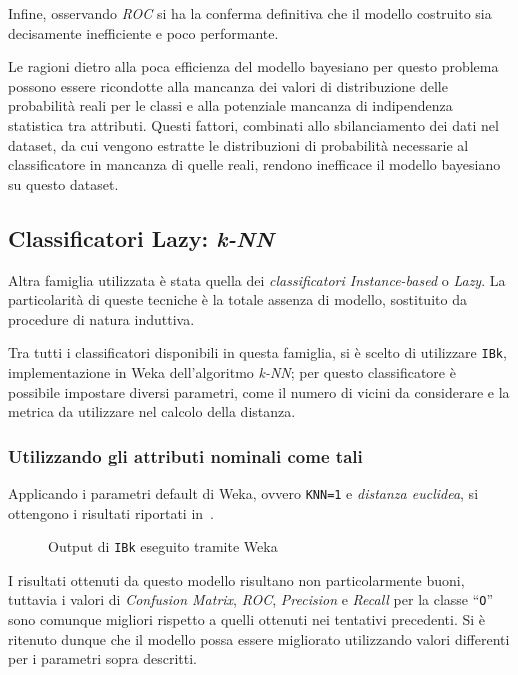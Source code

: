Infine, osservando \emph{ROC} si ha la conferma definitiva che il modello costruito sia decisamente inefficiente e poco performante.

Le ragioni dietro alla poca efficienza del modello bayesiano per questo problema possono essere ricondotte alla mancanza dei valori di distribuzione delle probabilità reali per le classi e alla potenziale mancanza di indipendenza statistica tra attributi.
Questi fattori, combinati allo sbilanciamento dei dati nel dataset, da cui vengono estratte le distribuzioni di probabilità necessarie al classificatore in mancanza di quelle reali, rendono inefficace il modello bayesiano su questo dataset.

\subsection{Classificatori Lazy: \emph{k-NN}}\label{subsec:ibk}

Altra famiglia utilizzata è stata quella dei \emph{classificatori Instance-based} o \emph{Lazy}.
La particolarità di queste tecniche è la totale assenza di modello, sostituito da procedure di natura induttiva.

Tra tutti i classificatori disponibili in questa famiglia, si è scelto di utilizzare \texttt{IBk}, implementazione in Weka dell'algoritmo \emph{k-NN};
per questo classificatore è possibile impostare diversi parametri, come il numero di vicini da considerare e la metrica da utilizzare nel calcolo della distanza.

\subsubsection{Utilizzando gli attributi nominali come tali}\label{subsub:ibk:nominal}

Applicando i parametri default di Weka, ovvero \texttt{KNN=1} e \emph{distanza euclidea}, si ottengono i risultati riportati in~.

\begin{figure}[H]
  \centering
  \caption{Output di \texttt{IBk} eseguito tramite Weka}%
  \label{fig:ibk:1}
\end{figure}

I risultati ottenuti da questo modello risultano non particolarmente buoni, tuttavia i valori di \emph{Confusion Matrix}, \emph{ROC}, \emph{Precision} e \emph{Recall} per la classe ``\texttt{O}'' sono comunque migliori rispetto a quelli ottenuti nei tentativi precedenti.
Si è ritenuto dunque che il modello possa essere migliorato utilizzando valori differenti per i parametri sopra descritti.


